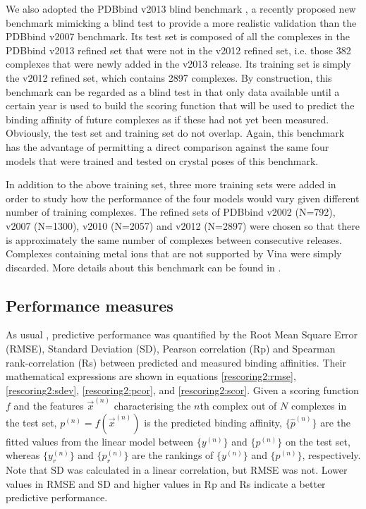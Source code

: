 \documentclass[twocolumn]{bmcart}
\begin{document}
We also adopted the PDBbind v2013 blind benchmark \cite{1647}, a recently proposed new benchmark mimicking a blind test to provide a more realistic validation than the PDBbind v2007 benchmark. Its test set is composed of all the complexes in the PDBbind v2013 refined set that were not in the v2012 refined set, i.e. those 382 complexes that were newly added in the v2013 release. Its training set is simply the v2012 refined set, which contains 2897 complexes. By construction, this benchmark can be regarded as a blind test in that only data available until a certain year is used to build the scoring function that will be used to predict the binding affinity of future complexes as if these had not yet been measured. Obviously, the test set and training set do not overlap. Again, this benchmark has the advantage of permitting a direct comparison against the same four models that were trained and tested on crystal poses \cite{1647} of this benchmark.

In addition to the above training set, three more training sets were added in order to study how the performance of the four models would vary given different number of training complexes. The refined sets of PDBbind v2002 (N=792), v2007 (N=1300), v2010 (N=2057) and v2012 (N=2897) were chosen so that there is approximately the same number of complexes between consecutive releases. Complexes containing metal ions that are not supported by Vina were simply discarded. More details about this benchmark can be found in \cite{1647}.

\subsection*{Performance measures}

As usual \cite{1313}, predictive performance was quantified by the Root Mean Square Error (RMSE), Standard Deviation (SD), Pearson correlation (Rp) and Spearman rank-correlation (Rs) between predicted and measured binding affinities. Their mathematical expressions are shown in equations \ref{rescoring2:rmse}, \ref{rescoring2:sdev}, \ref{rescoring2:pcor}, and \ref{rescoring2:scor}. Given a scoring function $f$ and the features $\overrightarrow{x}^{(n)}$ characterising the $n$th complex out of $N$ complexes in the test set, $p^{(n)}=f(\overrightarrow{x}^{(n)})$ is the predicted binding affinity, $\{\hat{p}^{(n)}\}$ are the fitted values from the linear model between $\{y^{(n)}\}$ and $\{p^{(n)}\}$ on the test set, whereas $\{y_r^{(n)}\}$ and $\{p_r^{(n)}\}$ are the rankings of $\{y^{(n)}\}$ and $\{p^{(n)}\}$, respectively. Note that SD was calculated in a linear correlation, but RMSE was not. Lower values in RMSE and SD and higher values in Rp and Rs indicate a better predictive performance.
\end{document}
